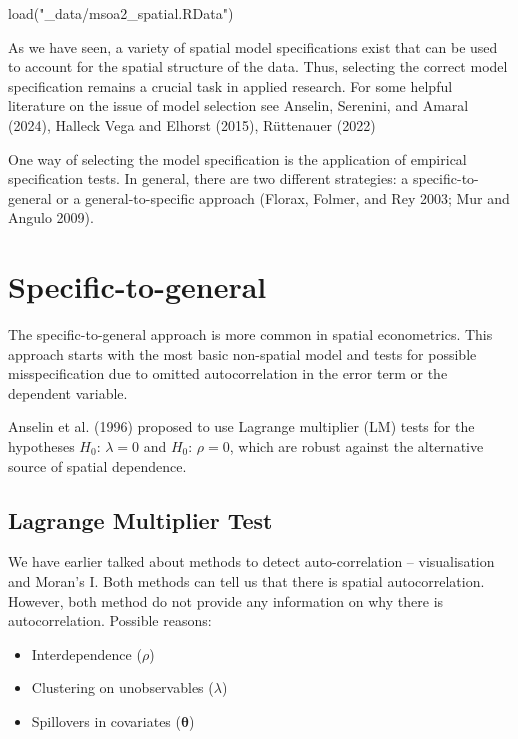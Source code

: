 \documentclass[
  letterpaper,
  DIV=11,
  numbers=noendperiod]{scrreprt}
\newenvironment{Shaded}{\begin{snugshade}}{\end{snugshade}}
\newcommand{\FunctionTok}[1]{\textcolor[rgb]{0.28,0.35,0.67}{#1}}
\newcommand{\NormalTok}[1]{\textcolor[rgb]{0.00,0.23,0.31}{#1}}
\newcommand{\StringTok}[1]{\textcolor[rgb]{0.13,0.47,0.30}{#1}}
\providecommand{\tightlist}{%
  \setlength{\itemsep}{0pt}\setlength{\parskip}{0pt}}\usepackage{longtable,booktabs,array}
\begin{document}
\begin{Shaded}
\begin{Highlighting}[]
\FunctionTok{load}\NormalTok{(}\StringTok{"\_data/msoa2\_spatial.RData"}\NormalTok{)}
\end{Highlighting}
\end{Shaded}

As we have seen, a variety of spatial model specifications exist that
can be used to account for the spatial structure of the data. Thus,
selecting the correct model specification remains a crucial task in
applied research. For some helpful literature on the issue of model
selection see Anselin, Serenini, and Amaral (2024), Halleck Vega and
Elhorst (2015), Rüttenauer (2022)

One way of selecting the model specification is the application of
empirical specification tests. In general, there are two different
strategies: a specific-to-general or a general-to-specific approach
(Florax, Folmer, and Rey 2003; Mur and Angulo 2009).

\hypertarget{specific-to-general}{%
\section{Specific-to-general}\label{specific-to-general}}

The specific-to-general approach is more common in spatial econometrics.
This approach starts with the most basic non-spatial model and tests for
possible misspecification due to omitted autocorrelation in the error
term or the dependent variable.

Anselin et al. (1996) proposed to use Lagrange multiplier (LM) tests for
the hypotheses \(H_0\): \(\lambda=0\) and \(H_0\): \(\rho=0\), which are
robust against the alternative source of spatial dependence.

\hypertarget{lagrange-multiplier-test}{%
\subsection{Lagrange Multiplier Test}\label{lagrange-multiplier-test}}

We have earlier talked about methods to detect auto-correlation --
visualisation and Moran's I. Both methods can tell us that there is
spatial autocorrelation. However, both method do not provide any
information on why there is autocorrelation. Possible reasons:

\begin{itemize}
\tightlist
\item
  Interdependence (\(\rho\))
\item
  Clustering on unobservables (\(\lambda\))
\item
  Spillovers in covariates (\(\boldsymbol{\mathbf{\theta}}\))
\end{itemize}
\end{document}
